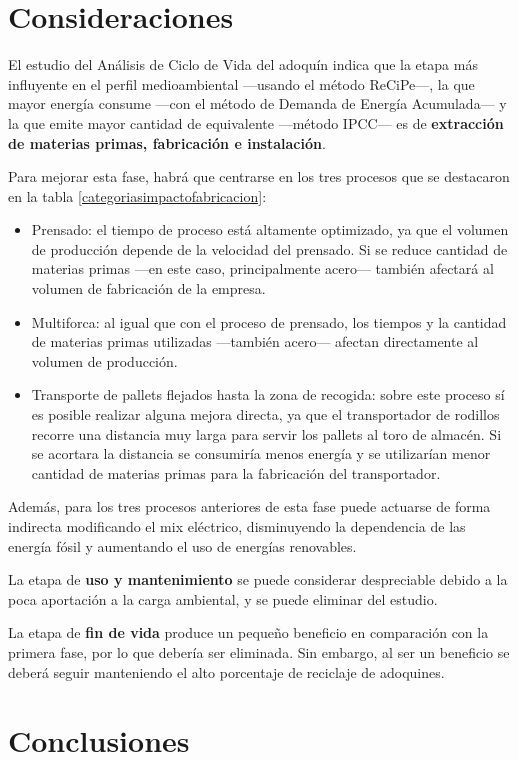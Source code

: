 \section{Consideraciones}

El estudio del Análisis de Ciclo de Vida del adoquín indica que la etapa más influyente en el perfil medioambiental —usando el método ReCiPe—, la que mayor energía consume —con el método de Demanda de Energía Acumulada— y la que emite mayor cantidad de  equivalente —método IPCC— es de \textbf{extracción de materias primas, fabricación e instalación}.

Para mejorar esta fase, habrá que centrarse en los tres procesos que se destacaron en la tabla \ref{categoriasimpactofabricacion}:

\begin{itemize}
  \item Prensado: el tiempo de proceso está altamente optimizado, ya que el volumen de producción depende de la velocidad del prensado. Si se reduce cantidad de materias primas —en este caso, principalmente acero— también afectará al volumen de fabricación de la empresa.
  \item Multiforca: al igual que con el proceso de prensado, los tiempos y la cantidad de materias primas utilizadas —también acero— afectan directamente al volumen de producción.
  \item Transporte de pallets flejados hasta la zona de recogida: sobre este proceso sí es posible realizar alguna mejora directa, ya que el transportador de rodillos recorre una distancia muy larga para servir los pallets al toro de almacén. Si se acortara la distancia se consumiría menos energía y se utilizarían menor cantidad de materias primas para la fabricación del transportador.
\end{itemize}

Además, para los tres procesos anteriores de esta fase puede actuarse de forma indirecta modificando el mix eléctrico, disminuyendo la dependencia de las energía fósil y aumentando el uso de energías renovables.

La etapa de \textbf{uso y mantenimiento} se puede considerar despreciable debido a la poca aportación a la carga ambiental, y se puede eliminar del estudio.

La etapa de \textbf{fin de vida} produce un pequeño beneficio en comparación con la primera fase, por lo que debería ser eliminada. Sin embargo, al ser un beneficio se deberá seguir manteniendo el alto porcentaje de reciclaje de adoquines.

\section{Conclusiones}
